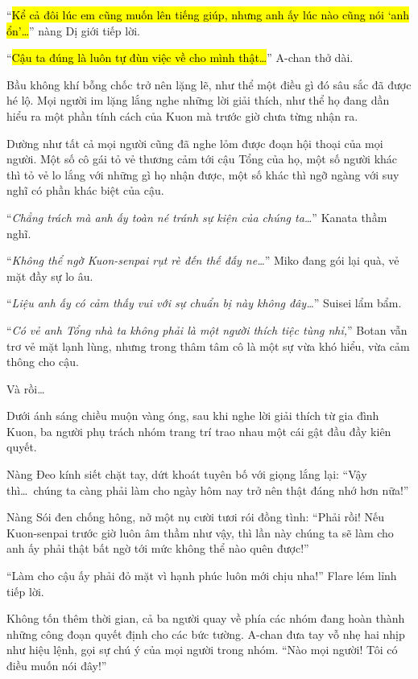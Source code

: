 \documentclass[../main.tex]{subfiles}
\begin{document}
``\hl{Kể cả đôi lúc em cũng muốn lên tiếng giúp, nhưng anh ấy lúc nào cũng nói `anh ổn'\dots}'' nàng Dị giới tiếp lời.

``\hl{Cậu ta đúng là luôn tự đùn việc về cho mình thật\dots}'' A-chan thở dài.

Bầu không khí bỗng chốc trở nên lặng lẽ, như thể một điều gì đó sâu sắc đã được hé lộ. Mọi người im lặng lắng nghe những lời giải thích, như thể họ đang dần hiểu ra một phần tính cách của Kuon mà trước giờ chưa từng nhận ra.

Dường như tất cả mọi người cũng đã nghe lỏm được đoạn hội thoại của mọi người. Một số cô gái tỏ vẻ thương cảm tới cậu Tổng của họ, một số người khác thì tỏ vẻ lo lắng với những gì họ nhận được, một số khác thì ngỡ ngàng với suy nghĩ có phần khác biệt của cậu.

``\textit{Chẳng trách mà anh ấy toàn né tránh sự kiện của chúng ta\dots}'' Kanata thầm nghĩ.

``\textit{Không thể ngờ Kuon-senpai rụt rè đến thế đấy ne\dots}'' Miko đang gói lại quà, vẻ mặt đầy sự lo âu.

``\textit{Liệu anh ấy có cảm thấy vui với sự chuẩn bị này không đây\dots}'' Suisei lẩm bẩm.

``\textit{Có vẻ anh Tổng nhà ta không phải là một người thích tiệc tùng nhỉ,}'' Botan vẫn trơ vẻ mặt lạnh lùng, nhưng trong thâm tâm cô là một sự vừa khó hiểu, vừa cảm thông cho cậu.

Và rồi\dots

Dưới ánh sáng chiều muộn vàng óng, sau khi nghe lời giải thích từ gia đình Kuon, ba người phụ trách nhóm trang trí trao nhau một cái gật đầu đầy kiên quyết.

Nàng Đeo kính siết chặt tay, dứt khoát tuyên bố với giọng lắng lại: ``Vậy thì\dots\ chúng ta càng phải làm cho ngày hôm nay trở nên thật đáng nhớ hơn nữa!''

Nàng Sói đen chống hông, nở một nụ cười tươi rói đồng tình: ``Phải rồi! Nếu Kuon-senpai trước giờ luôn âm thầm như vậy, thì lần này chúng ta sẽ làm cho anh ấy phải thật bất ngờ tới mức không thể nào quên được!''

``Làm cho cậu ấy phải đỏ mặt vì hạnh phúc luôn mới chịu nha!'' Flare lém lỉnh tiếp lời.

Không tốn thêm thời gian, cả ba người quay về phía các nhóm đang hoàn thành những công đoạn quyết định cho các bức tường. A-chan đưa tay vỗ nhẹ hai nhịp như hiệu lệnh, gọi sự chú ý của mọi người trong nhóm. ``Nào mọi người! Tôi có điều muốn nói đây!''
\end{document}
